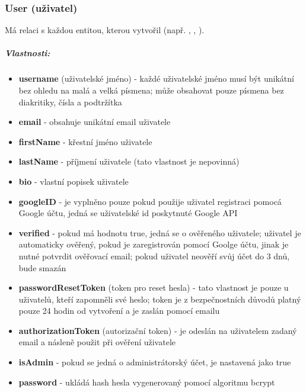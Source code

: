 \documentclass[12pt, a4paper,
 twoside,        %
 openright
]{report}
\newenvironment{propertiesItemize}{
\begin{itemize}{ 
  }}
  {\end{itemize}}
\begin{document}
    	            \subsubsection{User (uživatel)}  Má relaci  s každou entitou, kterou vytvořil (např. , , ).
                         \subparagraph{Vlastnosti:}  
                           \begin{propertiesItemize}
                                \item \textbf{username} (uživatelské jméno) - každé uživatelské jméno musí být unikátní bez ohledu na malá a velká písmena; může obsahovat pouze písmena bez diakritiky, čísla a podtržítka
                                \item \textbf{email} - obsahuje unikátní email uživatele
                                \item \textbf{firstName} - křestní jméno uživatele
                                \item \textbf{lastName} - příjmení uživatele (tato vlastnost je nepovinná)
                                \item \textbf{bio} - vlastní popisek uživatele
                                \item \textbf{googleID} - je vyplněno pouze pokud použije uživatel registraci pomocá Google účtu, jedná se uživatelské id poskytnuté Google API 
                                \item \textbf{verified} - pokud má hodnotu true, jedná se o ověřeného uživatele; uživatel je automaticky ověřený, pokud je zaregistrován pomocí Goolge účtu, jinak je nutné potvrdit ověřovací email; pokud uživatel neověří svůj účet do 3 dnů, bude smazán
                                \item \textbf{passwordResetToken} (token pro reset hesla) - tato vlastnost je pouze u uživatelů, kteří zapomněli své heslo; token je z bezpečnostních důvodů platný pouze 24 hodin od vytvoření a je zaslán pomocí emailu
                                \item \textbf{authorizationToken} (autorizační token) - je odeslán na uživatelem zadaný email a násleně použit při ověření uživatele
                                \item \textbf{isAdmin} - pokud se jedná o administrátorský účet, je nastavená jako true
                                \item \textbf{password} - ukládá hash hesla vygenerovaný pomocí algoritmu bcrypt
                        \end{propertiesItemize}
\end{document}
